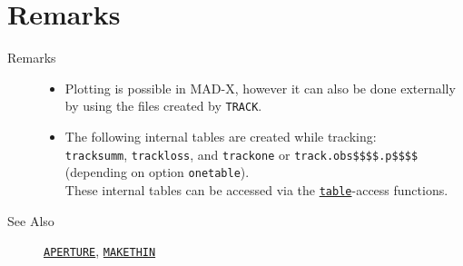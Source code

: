 \section{Remarks}
\begin{description}
   \item[Remarks] 
     \begin{itemize}
        \item Plotting is possible in MAD-X, however it can also be done
          externally by using the files created by \texttt{TRACK}. 
	\item The following internal tables are created while tracking:
          \\
          \texttt{tracksumm}, 
          \texttt{trackloss}, and 
          \texttt{trackone} or 
          \texttt{track.obs\$\$\$\$.p\$\$\$\$} 
          (depending on option \texttt{onetable}).
          \\
          These internal tables can be accessed via the 
          \href{../Introduction/expression.html#table}{\texttt{table}}-access functions.
          
     \end{itemize}
     
   \item[See Also] \href{../Introduction/aperture.html}{\texttt{APERTURE}}, 
     \href{../makethin/makethin.html}{\texttt{MAKETHIN}}
\end{description}


